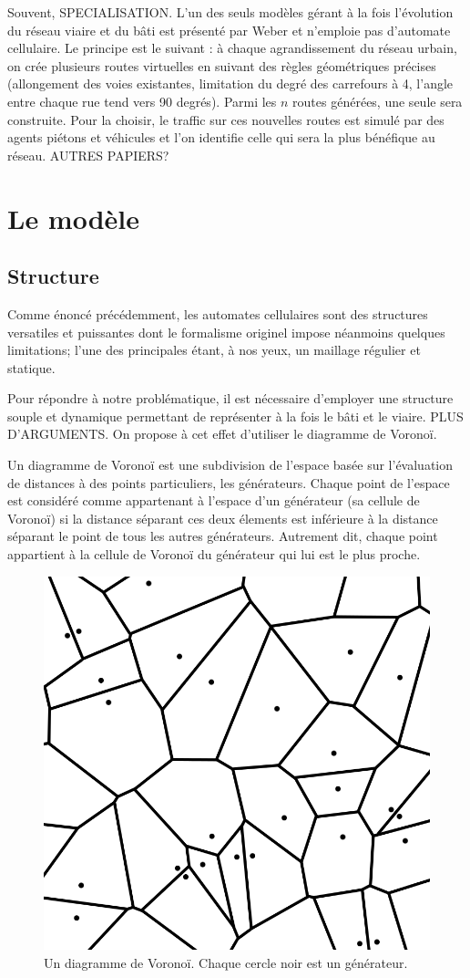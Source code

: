 \documentclass[12pt]{article}
\begin{document}
Souvent, SPECIALISATION. L'un des seuls modèles gérant à la fois
l'évolution du réseau viaire et du bâti est présenté par Weber
\cite{Weber2009} et n'emploie pas d'automate cellulaire. Le principe
est le suivant : à chaque agrandissement du réseau urbain, on crée
plusieurs routes virtuelles en suivant des règles géométriques
précises (allongement des voies existantes, limitation du degré des
carrefours à 4, l'angle entre chaque rue tend vers 90 degrés). Parmi
les $n$ routes générées, une seule sera construite. Pour la choisir,
le traffic sur ces nouvelles routes est simulé par des agents piétons
et véhicules et l'on identifie celle qui sera la plus bénéfique au
réseau. AUTRES PAPIERS?

\section{Le modèle}

\subsection{Structure}

Comme énoncé précédemment, les automates cellulaires sont des
structures versatiles et puissantes dont le formalisme originel impose
néanmoins quelques limitations; l'une des principales étant, à nos
yeux, un maillage régulier et statique.

Pour répondre à notre problématique, il est nécessaire d'employer une
structure souple et dynamique permettant de représenter à la fois le
bâti et le viaire. PLUS D'ARGUMENTS. On propose à cet effet d'utiliser
le diagramme de Voronoï.

Un diagramme de Voronoï est une subdivision de l'espace basée sur
l'évaluation de distances à des points particuliers, les
générateurs. Chaque point de l'espace est considéré comme appartenant
à l'espace d'un générateur (sa cellule de Voronoï) si la distance
séparant ces deux élements est inférieure à la distance séparant le
point de tous les autres générateurs. Autrement dit, chaque point
appartient à la cellule de Voronoï du générateur qui lui est le plus
proche.

\begin{figure}[h]
  \centering
  \includegraphics[width=0.5\linewidth]{images/voronoi.png}
  \caption{Un diagramme de Voronoï. Chaque cercle noir est un générateur.}
  \label{fig:voronoi}
\end{figure}
\end{document}
